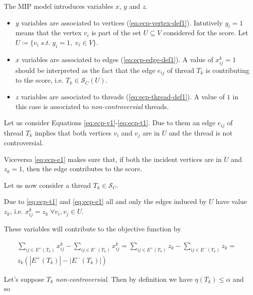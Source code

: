 The \acrshort{MIP} model introduces variables $x$, $y$ and $z$.
\begin{itemize}
	\item $y$ variables are associated to vertices
	      (\autoref{eq:ecp-vertex-def1}). Intutively $y_i = 1$ means that the
	      vertex $v_{i} $ is part of the set $U \subseteq V$ considered for the
	      score. Let $U \coloneqq \{ v_{i} \; s.t. \; y_{i} = 1, \;
		      v_{i} \in V \}$.
	\item $x$ variables are associated to edges (\autoref{eq:ecp-edge-def1}).
	      A value of $x_{ij}^{k} = 1$ should be interpreted as the fact that
	      the edge $e_{ij} $ of thread $T_{k} $ is contributing to the score,
	      i.e. $T_k \in \mathcal{S}_{C} (U)$.
	\item $z$ variables are associated to threads
	      (\autoref{eq:ecp-thread-def1}). A value of $1$ in this case
	      is associated to \emph{non-controversial} threads.
\end{itemize}

Let us consider Equations \ref{eq:ecp-v1}-\ref{eq:ecp-t1}. Due to them an
edge $e_{ij}  $ of thread $T_{k} $ implies that
both vertices $v_{i} $ and $v_{j} $ are in $U$ and the thread is not controversial.

Viceversa \autoref{eq:ecp-e1} makes sure that, if both the incident vertices
are in $U$ and $z_{k} = 1$, then the edge contributes to the score.

Let us now consider a thread $T_k \in \mathcal{S}_{C} $.

Due to \autoref{eq:ecp-t1} and \autoref{eq:ecp-e1} all and only the edges
induced by $U$ have value $z_{k} $, i.e. $x_{ij}^{k} = z_k \; \forall v_{i}, v_{j}
	\in U$.

These variables will contribute to the objective function by

\begin{multline}
	\label{eq:ecp-thread-contribution}
	\sum^{}_{ij \in E^{+} (T_{k})} x_{ij} ^{k} - \sum_{ij \in E^{-} (T_{k})}
	x_{ij} ^{k} = \sum^{}_{ij \in E^{+} (T_{k})} z_k - \sum_{ij \in E^{-} (T_{k})}
	z_k = \\
	z_k (|E^{+} (T_{k})| - |E^{-} (T_{k})|)
\end{multline}

Let's suppose $T_k$ \emph{non-controversial}. Then by definition we have
$\eta(T_k) \leq \alpha $ and so

